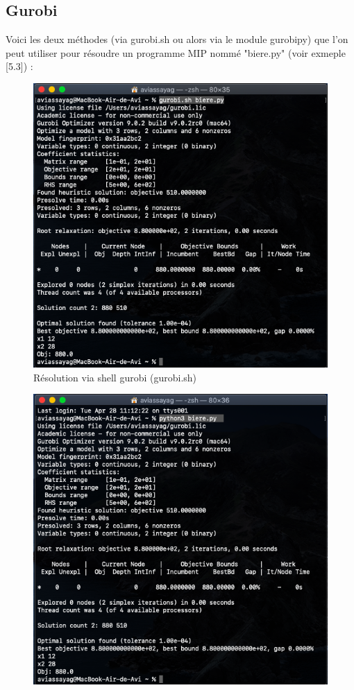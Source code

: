 \documentclass[a4paper, 12pt, twoside]{article}
\begin{document}
{{{\subsection{Gurobi}
Voici les deux méthodes (via gurobi.sh ou alors via le module gurobipy) que l'on peut utiliser pour résoudre un programme MIP nommé "biere.py" (voir exmeple [5.3]) :
\begin{center}
\begin{figure}[h]
\centering
\includegraphics[scale=0.4]{gurobish.png}
\caption{Résolution via shell gurobi (gurobi.sh)}
\end{figure}
\begin{figure}[h]
\centering
\includegraphics[scale=0.4]{gurobipython.png}

\end{figure}
\end{center}}}}
\end{document}
